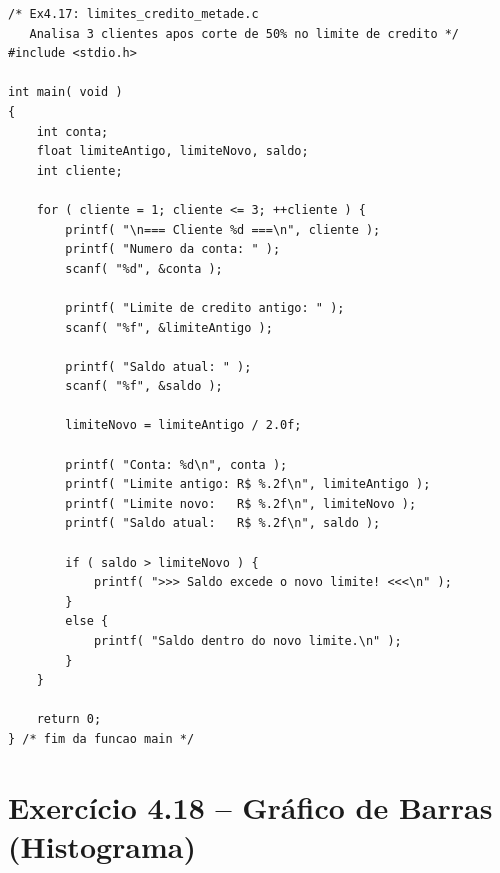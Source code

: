 \documentclass[12pt,a4paper]{article}
\begin{document}
\begin{respostabox}
\begin{lstlisting}
/* Ex4.17: limites_credito_metade.c
   Analisa 3 clientes apos corte de 50% no limite de credito */
#include <stdio.h>

int main( void )
{
    int conta;
    float limiteAntigo, limiteNovo, saldo;
    int cliente;

    for ( cliente = 1; cliente <= 3; ++cliente ) {
        printf( "\n=== Cliente %d ===\n", cliente );
        printf( "Numero da conta: " );
        scanf( "%d", &conta );

        printf( "Limite de credito antigo: " );
        scanf( "%f", &limiteAntigo );

        printf( "Saldo atual: " );
        scanf( "%f", &saldo );

        limiteNovo = limiteAntigo / 2.0f;

        printf( "Conta: %d\n", conta );
        printf( "Limite antigo: R$ %.2f\n", limiteAntigo );
        printf( "Limite novo:   R$ %.2f\n", limiteNovo );
        printf( "Saldo atual:   R$ %.2f\n", saldo );

        if ( saldo > limiteNovo ) {
            printf( ">>> Saldo excede o novo limite! <<<\n" );
        }
        else {
            printf( "Saldo dentro do novo limite.\n" );
        }
    }

    return 0;
} /* fim da funcao main */
\end{lstlisting}
\end{respostabox}

\newpage

\section{Exercício 4.18 -- Gráfico de Barras (Histograma)}
\end{document}
